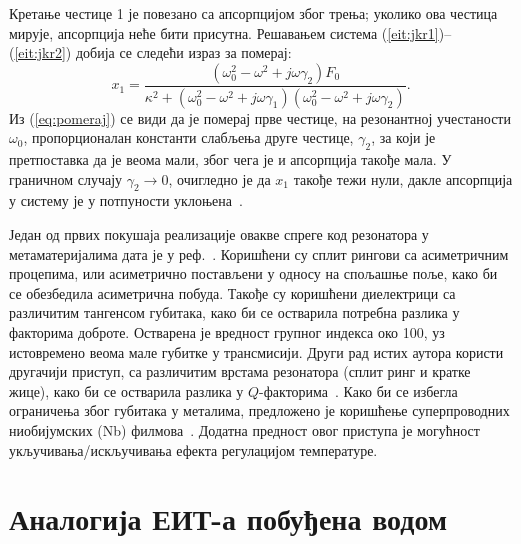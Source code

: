 \documentclass[main.tex]{subfiles}
\begin{document}
Кретање честице 1 је повезано са апсорпцијом због трења; уколико ова честица мирује, апсорпција неће бити присутна. Решавањем система (\ref{eit:jkr1})–(\ref{eit:jkr2}) добија се следећи израз за померај:
\begin{equation}
    \label{eq:pomeraj}
    x_1 = \frac{\left( \omega_0^2 - \omega^2 + j\omega\gamma_2 \right)F_0}{\kappa^2 + \left( \omega_0^2 - \omega^2 + j\omega\gamma_1 \right) \left( \omega_0^2 - \omega^2 + j\omega\gamma_2   \right)}.
\end{equation}
Из (\ref{eq:pomeraj}) се види да је померај прве честице, на резонантној учестаности $\omega_0$, пропорционалан константи слабљења друге честице, $\gamma_2$, за који је претпоставка да је веома мали, због чега је и апсорпција такође мала. У граничном случају $\gamma_2\to 0$, очигледно је да $x_1$ такође тежи нули, дакле апсорпција у систему је у потпуности уклоњена~\cite{garrido2002classical}.

Један од првих покушаја реализације овакве спреге код резонатора у метаматеријалима дата је у реф.~\cite{tassin:09}. Коришћени су сплит рингови са асиметричним процепима, или асиметрично постављени у односу на спољашње поље, како би се обезбедила асиметрична побуда. Такође су коришћени диелектрици са различитим тангенсом губитака, како би се остварила потребна разлика у факторима доброте. Остварена је вредност групног индекса око 100, уз истовремено веома мале губитке у трансмисији. Други рад истих аутора користи другачији приступ, са различитим врстама резонатора (сплит ринг и кратке жице), како би се остварила разлика у $Q$-факторима~\cite{tassin2009planar}. Како би се избегла ограничења због губитака у металима, предложено је коришћење суперпроводних ниобијумских (Nb) филмова~\cite{cihan}. Додатна предност овог приступа је могућност укључивања/искључивања ефекта регулацијом температуре.

\section{Аналогија ЕИТ-а побуђена водом}%
\label{sec:analogija_eit_a_pobudjena_vodom}
\end{document}
